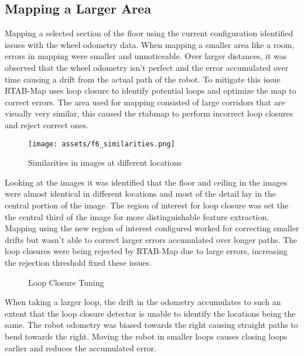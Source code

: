 \documentclass[conference, letterpaper]{IEEEtran}
\begin{document}
\subsection{Mapping a Larger Area}

Mapping a selected section of the floor using the current configuration 
identified issues with the wheel odometry data. When mapping a smaller area like
a room, errors in mapping were smaller and unnoticeable. Over larger distances, 
it was observed that the wheel odometry isn't perfect and the error accumulated 
over time causing a drift from the actual path of the robot. To mitigate this 
issue RTAB-Map uses loop closure to identify potential loops and optimize the 
map to correct errors. The area used for mapping consisted of large corridors 
that are visually very similar, this caused the rtabmap to perform incorrect 
loop closures and reject correct ones.

\begin{figure}[ht]
  \centering
    \texttt{[image: assets/f6\_similarities.png]} 
  \caption{Similarities in images at different locations}  
\end{figure}

Looking at the images it was identified that the floor and ceiling in the 
images were almost identical in different locations and most of the detail lay 
in the central portion of the image. The region of interest for loop closure was
set the the central third of the image for more distinguishable feature 
extraction. Mapping using the new region of interest configured worked for 
correcting smaller drifts but wasn't able to correct larger errors accumulated 
over longer paths. The loop closures were being rejected by RTAB-Map due to 
large errors, increasing the rejection threshold fixed these issues.

\begin{figure}[ht]
  \centering
  \hfill
  \caption{Loop Closure Tuning}  
\end{figure}

When taking a larger loop, the drift in the odometry accumulates to such an 
extent that the loop closure detector is unable to identify the locations being
the same. The robot odometry was biased towards the right causing straight paths
to bend towards the right. Moving the robot in smaller loops causes closing 
loops earlier and reduces the accumulated error.
\end{document}
